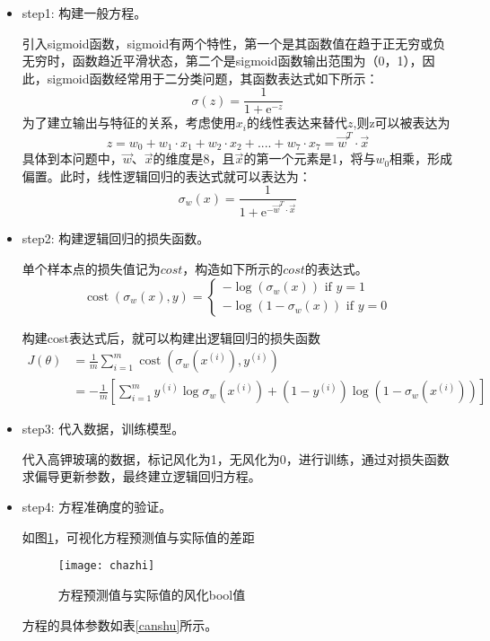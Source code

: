 \documentclass[withoutpreface,bwprint]{cumcmthesis} %
\begin{document}
\begin{itemize}
	\item step1: 构建一般方程。
	
	
	引入sigmoid函数，sigmoid有两个特性，第一个是其函数值在趋于正无穷或负无穷时，函数趋近平滑状态，第二个是sigmoid函数输出范围为（0，1），因此，sigmoid函数经常用于二分类问题，其函数表达式如下所示： $$\sigma(z)=\frac{1}{1+\mathrm{e}^{-z}}$$ 为了建立输出与特征的关系，考虑使用$x_{i}$的线性表达来替代$z$,则z可以被表达为 $$z=w_{0}+w_{1}\cdot x_{1} + w_{2}\cdot x_{2}+....+w_{7} \cdot x_{7} = \vec{w} ^{T} \cdot \vec{x}$$ 具体到本问题中，$\vec{w}$、$\vec{x}$的维度是8，且$\vec{x}$的第一个元素是1，将与$w_{0}$相乘，形成偏置。此时，线性逻辑回归的表达式就可以表达为： $$\sigma_{w}(x)=\frac{1}{1+\mathrm{e}^{-\vec{w} ^{T} \cdot \vec{x}}}$$
	\item step2: 构建逻辑回归的损失函数。
	
	
	单个样本点的损失值记为$cost$，构造如下所示的$cost$的表达式。 
	\[
	\operatorname{cost}\left(\sigma_{w}(x), y\right)=\left\{\begin{array}{r}
		-\log \left(\sigma_{w}(x)\right) \text { if } y=1 \\
		-\log \left(1-\sigma_{w}(x)\right) \text { if } y=0
	\end{array}\right.
	\] 
	
	构建cost表达式后，就可以构建出逻辑回归的损失函数
	\[\begin{aligned} J(\theta) &=\frac{1}{m} \sum_{i=1}^{m} \operatorname{cost}\left(\sigma_{w}\left(x^{(i)}\right), y^{(i)}\right) \ \\ &=-\frac{1}{m}\left[\sum_{i=1}^{m} y^{(i)} \log \sigma_{w}\left(x^{(i)}\right)+\left(1-y^{(i)}\right) \log \left(1-\sigma_{w}\left(x^{(i)}\right)\right)\right] \end{aligned}
	\]
	\item step3: 代入数据，训练模型。
	
	代入高钾玻璃的数据，标记风化为1，无风化为0，进行训练，通过对损失函数求偏导更新参数，最终建立逻辑回归方程。
	
	\item step4: 方程准确度的验证。
	
	如图\ref{chazhi}，可视化方程预测值与实际值的差距
	
	\begin{figure}[!h]
		\centering
		\texttt{[image: chazhi]}
		\caption{方程预测值与实际值的风化bool值}
		\label{chazhi}
	\end{figure}
	
	方程的具体参数如表\ref{canshu}所示。
	

\end{itemize}
\end{document}
